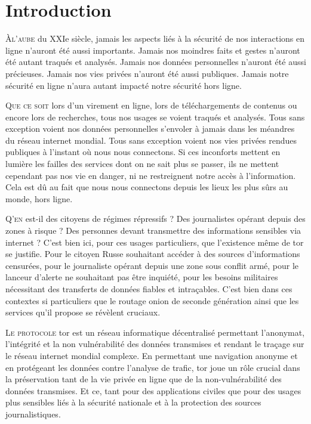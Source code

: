 \section{Introduction}\label{sec:introduction}

\lettrine{À}{l'aube} du XXIe siècle, jamais les aspects liés à la sécurité de nos interactions en ligne n'auront été aussi importants. 
Jamais nos moindres faits et gestes n'auront été autant traqués et analysés. 
Jamais nos données personnelles n'auront été aussi précieuses. 
Jamais nos vies privées n'auront été aussi publiques. 
Jamais notre sécurité en ligne n'aura autant impacté notre sécurité hors ligne.

\lettrine{Q}{ue ce soit} lors d'un virement en ligne, lors de téléchargements de contenus ou encore lors de recherches, tous nos usages se voient traqués et analysés. 
Tous sans exception voient nos données personnelles s'envoler à jamais dans les méandres du réseau internet mondial. 
Tous sans exception voient nos vies privées rendues publiques à l'instant où nous nous connectons.
Si ces inconforts mettent en lumière les failles des services dont on ne sait plus se passer, ils ne mettent cependant pas nos vie en danger, ni ne restreignent notre accès à l'information. 
Cela est dû au fait que nous nous connectons depuis les lieux les plus sûrs au monde, hors ligne.

\lettrine{Q}{'en} est-il des citoyens de régimes répressifs ? 
Des journalistes opérant depuis des zones à risque ? 
Des personnes devant transmettre des informations sensibles via internet ? 
C'est bien ici, pour ces usages particuliers, que l'existence même de \acrshort{tor} se justifie. 
Pour le citoyen Russe souhaitant accéder à des sources d'informations censurées, pour le journaliste opérant depuis une zone sous conflit armé, pour le lanceur d'alerte ne souhaitant pas être inquiété, pour les besoins militaires nécessitant des transferts de données fiables et intraçables. 
C'est bien dans ces contextes si particuliers que le routage onion de seconde génération ainsi que les services qu'il propose se révèlent cruciaux.

\lettrine{L}{e protocole} \acrfull{tor} est un réseau informatique décentralisé permettant l'anonymat, l'intégrité et la non vulnérabilité des données transmises et rendant le traçage sur le réseau internet mondial complexe.
En permettant une navigation anonyme et en protégeant les données contre l'analyse de trafic, \acrshort{tor} joue un rôle crucial dans la préservation tant de la vie privée en ligne que de la non-vulnérabilité des données transmises.
Et ce, tant pour des applications civiles que pour des usages plus sensibles liés à la sécurité nationale et à la protection des sources journalistiques.

